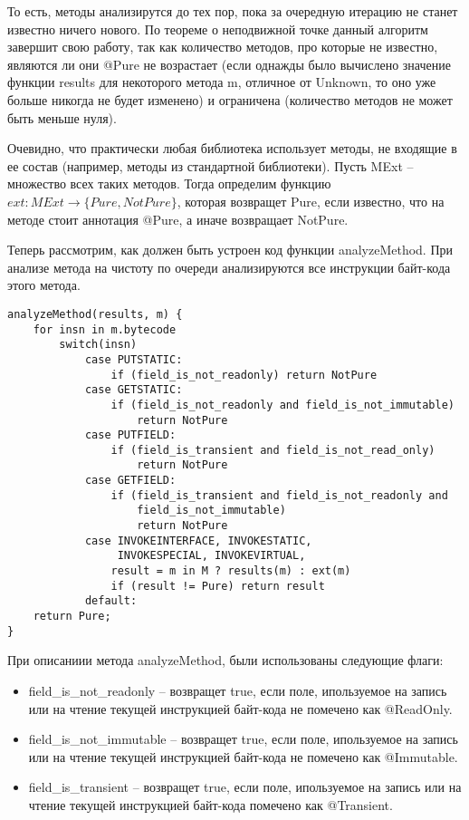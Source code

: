 То есть, методы анализирутся до тех пор, пока за очередную итерацию не станет известно ничего нового. По теореме о неподвижной точке данный алгоритм завершит свою работу, так как количество методов, про которые не известно, являются ли они @Pure не возрастает (если однажды было вычислено значение функции results для некоторого метода m, отличное от Unknown, то оно уже больше никогда не будет изменено) и ограничена (количество методов не может быть меньше нуля). 

Очевидно, что практически любая библиотека использует методы, не входящие в ее состав (например, методы из стандартной библиотеки). Пусть MExt -- множество всех таких методов. Тогда определим функцию \newline $ext: {MExt} \rightarrow \{Pure, NotPure\}$, которая возвращет Pure, если известно, что на методе стоит аннотация @Pure, а иначе возвращает NotPure. 

Теперь рассмотрим, как должен быть устроен код функции analyzeMethod. При анализе метода на чистоту по очереди анализируются все инструкции байт-кода этого метода. 

\begin{lstlisting}[caption=Анализ чистоты методов, label=code:purity_analyze_method]
analyzeMethod(results, m) {
    for insn in m.bytecode 
		switch(insn) 
		    case PUTSTATIC:
		        if (field_is_not_readonly) return NotPure
		    case GETSTATIC:
		        if (field_is_not_readonly and field_is_not_immutable) 
		            return NotPure
		    case PUTFIELD:
		        if (field_is_transient and field_is_not_read_only) 
                    return NotPure
		    case GETFIELD:
		        if (field_is_transient and field_is_not_readonly and
		            field_is_not_immutable)        
		            return NotPure
		    case INVOKEINTERFACE, INVOKESTATIC, 
		         INVOKESPECIAL, INVOKEVIRTUAL, 
		        result = m in M ? results(m) : ext(m)
		        if (result != Pure) return result
		    default:       
    return Pure;        
}
\end{lstlisting}

При описаниии метода analyzeMethod, были использованы следующие флаги:
\begin{itemize}
\item field\_is\_not\_readonly -- возвращет true, если поле, ипользуемое на запись или на чтение текущей инструкцией байт-кода не помечено как @ReadOnly.
\item field\_is\_not\_immutable -- возвращет true, если поле, ипользуемое на запись или на чтение текущей инструкцией байт-кода не помечено как @Immutable.
\item field\_is\_transient -- возвращет true, если поле, ипользуемое на запись или на чтение текущей инструкцией байт-кода помечено как @Transient.
\end{itemize}

